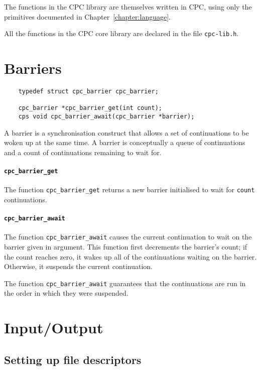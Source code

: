\documentclass[a4paper]{report}
\begin{document}
The functions in the CPC library are themselves written in CPC, using
only the primitives documented in Chapter~\ref{chapter:language}.

All the functions in the CPC core library are declared in the file
{\tt cpc-lib.h}.

\section{Barriers}

\begin{verbatim}
    typedef struct cpc_barrier cpc_barrier;

    cpc_barrier *cpc_barrier_get(int count);
    cps void cpc_barrier_await(cpc_barrier *barrier);
\end{verbatim}

A barrier is a synchronisation construct that allows a set of
continuations to be woken up at the same time.  A barrier is
conceptually a queue of continuations and a count of continuations
remaining to wait for.

\paragraph{\tt cpc\_barrier\_get} The function {\tt cpc\_barrier\_get}
returns a new barrier initialised to wait for {\tt count}
continuations.

\paragraph{\tt cpc\_barrier\_await} The function {\tt cpc\_barrier\_await}
causes the current continuation to wait on the barrier given in
argument.  This function first decrements the barrier's count; if the
count reaches zero, it wakes up all of the continuations waiting on
the barrier.  Otherwise, it suspends the current continuation.

The function {\tt cpc\_barrier\_await} guarantees that the
continuations are run in the order in which they were suspended.

\section{Input/Output}

\subsection{Setting up file descriptors}
\end{document}
